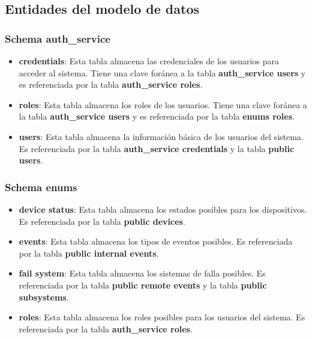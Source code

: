 \subsection{Entidades del modelo de datos}
 
\subsubsection{Schema auth\_service}

\begin{itemize}

  \item \textbf{credentials}: Esta tabla almacena las credenciales de los usuarios para acceder al sistema. Tiene una clave foránea a la tabla \textbf{auth\_service users} y es referenciada por la tabla \textbf{auth\_service roles}.

  \item \textbf{roles}: Esta tabla almacena los roles de los usuarios. Tiene una clave foránea a la tabla \textbf{auth\_service users} y es referenciada por la tabla \textbf{enums roles}.

  \item \textbf{users}: Esta tabla almacena la información básica de los usuarios del sistema. Es referenciada por la tabla \textbf{auth\_service credentials} y la tabla \textbf{public users}.

\end{itemize}


\subsubsection{Schema enums}

\begin{itemize}

  \item \textbf{device status}: Esta tabla almacena los estados posibles para los dispositivos. Es referenciada por la tabla \textbf{public devices}.

  \item \textbf{events}: Esta tabla almacena los tipos de eventos posibles. Es referenciada por la tabla \textbf{public internal events}.

  \item \textbf{fail system}: Esta tabla almacena los sistemas de falla posibles. Es referenciada por la tabla \textbf{public remote events} y la tabla \textbf{public subsystems}.

  \item \textbf{roles}: Esta tabla almacena los roles posibles para los usuarios del sistema. Es referenciada por la tabla \textbf{auth\_service roles}.

\end{itemize}


